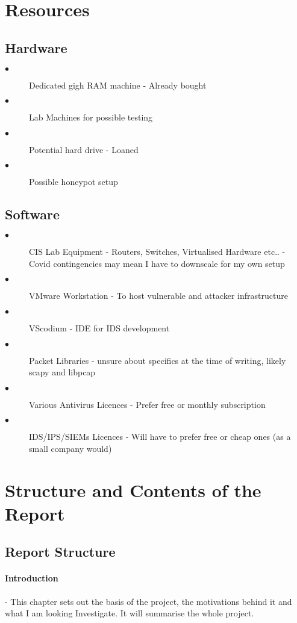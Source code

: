 \section{Resources}
\subsection{Hardware}
\begin{description}
	\item[$\bullet$] Dedicated gigh RAM machine - Already bought
	\item[$\bullet$] Lab Machines for possible testing
	\item[$\bullet$] Potential hard drive - Loaned
	\item[$\bullet$] Possible honeypot setup
\end{description}

\subsection{Software}
\begin{description}
	\item[$\bullet$] CIS Lab Equipment - Routers, Switches, Virtualised Hardware etc.. - Covid contingencies may mean I have to downscale for my own setup
	\item[$\bullet$] VMware Workstation - To host vulnerable and attacker infrastructure
	\item[$\bullet$] VScodium - IDE for IDS development
	\item[$\bullet$] Packet Libraries - unsure about specifics at the time of writing, likely scapy and libpcap
	\item[$\bullet$] Various Antivirus Licences - Prefer free or monthly subscription
	\item[$\bullet$] IDS/IPS/SIEMs Licences - Will have to prefer free or cheap ones (as a small company would)
\end{description}

\section{Structure and Contents of the Report}
\subsection{Report Structure}

\paragraph{Introduction}  -  This chapter sets out the basis of the project, the motivations behind it and what I am looking Investigate. 
It will summarise the whole project.

